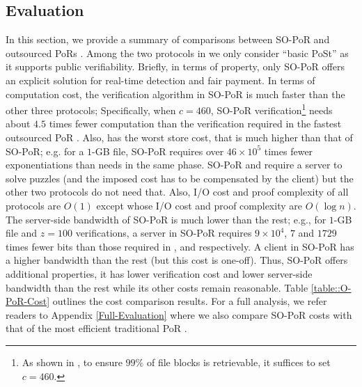 
\subsection{Evaluation}

In this section, we provide a summary of comparisons between   SO-PoR and outsourced PoRs  \cite{armknecht2014outsourced,xu2016lightweight,Storage-Time}. Among the two protocols  in \cite{Storage-Time} we only consider ``basic PoSt'' as it supports public verifiability. Briefly, in terms of property, only SO-PoR offers an explicit solution for real-time detection and fair payment. In terms of computation cost, the verification algorithm in SO-PoR is much faster than the other three protocols; Specifically, when $c=460$,  SO-PoR verification\footnote{As shown in \cite{DBLP:conf/ccs/AtenieseBCHKPS07}, to ensure $99\%$ of file blocks is retrievable, it  suffices to set $c=460$.} needs about $4.5$ times fewer computation than the verification required in the fastest outsourced PoR \cite{armknecht2014outsourced}.   Also, \cite{armknecht2014outsourced} has the worst store cost, that is  much higher than that of SO-PoR; e.g. for a $1$-GB file, SO-PoR requires over $46 \times 10^{\scriptscriptstyle 5}$ times fewer exponentiations than \cite{armknecht2014outsourced} needs in the same phase.  SO-PoR and \cite{Storage-Time} require a server to solve puzzles (and the imposed cost has to be compensated by the client) but the other two protocols do not need that. Also,  I/O cost and proof complexity of all protocols are $O(1)$ except \cite{Storage-Time} whose I/O cost and proof complexity are $O(\log n)$. The server-side bandwidth of SO-PoR is much lower than the rest;  e.g., for $1$-GB file and $z=100$ verifications, a server in SO-PoR requires $9\times 10^{\scriptscriptstyle4}$,  $7$ and $1729$ times fewer bits  than those required in \cite{armknecht2014outsourced}, \cite{xu2016lightweight} and \cite{Storage-Time} respectively.  A client in SO-PoR has a higher bandwidth than the rest (but this cost is one-off). Thus, SO-PoR offers additional properties, it has lower verification cost and lower server-side bandwidth than the rest while its other costs remain reasonable. Table \ref{table::O-PoR-Cost} outlines the cost comparison results. For a  full analysis, we refer readers to Appendix \ref{Full-Evaluation} where  we also compare SO-PoR costs with that of the most efficient  traditional PoR  \cite{DBLP:conf/asiacrypt/ShachamW08}.


